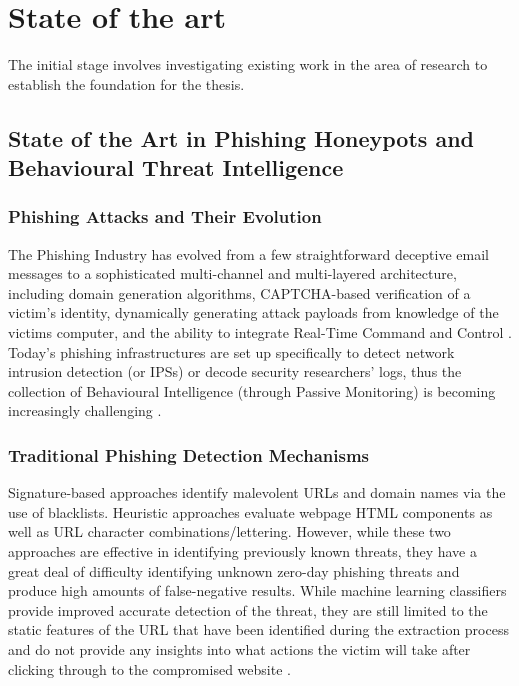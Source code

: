 
\chapter{State of the art}\label{chapter:chap2}

The initial stage involves investigating existing work in the area of research to establish the foundation for the thesis.
\section{State of the Art in Phishing Honeypots and Behavioural Threat Intelligence}

\subsection{Phishing Attacks and Their Evolution}

The Phishing Industry has evolved from a few straightforward deceptive email messages to a sophisticated multi-channel and multi-layered architecture, including domain generation algorithms, CAPTCHA-based verification of a victim's identity, dynamically generating attack payloads from knowledge of the victims computer, and the ability to integrate Real-Time Command and Control \cite{Leita2008Phishing,Ramachandran2006FastFlux}. Today's phishing infrastructures are set up specifically to detect network intrusion detection (or IPSs) or decode security researchers' logs, thus the collection of Behavioural Intelligence (through Passive Monitoring) is becoming increasingly challenging \cite{Bringer2012HoneypotSurvey}.

\subsection{Traditional Phishing Detection Mechanisms}
Signature-based approaches identify malevolent URLs and domain names via the use of blacklists. Heuristic approaches evaluate webpage HTML components as well as URL character combinations/lettering. However, while these two approaches are effective in identifying previously known threats, they have a great deal of difficulty identifying unknown zero-day phishing threats and produce high amounts of false-negative results. While machine learning classifiers provide improved accurate detection of the threat, they are still limited to the static features of the URL that have been identified during the extraction process and do not provide any insights into what actions the victim will take after clicking through to the compromised website \cite{Bailey2009Botnets,Bringer2012HoneypotSurvey}.

